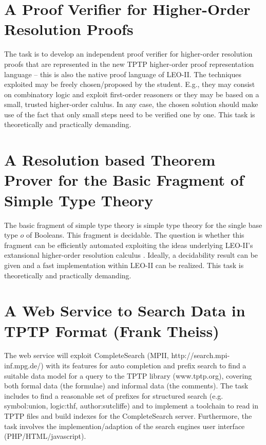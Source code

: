 \documentclass{article}
\begin{document}
\section{A Proof Verifier for Higher-Order Resolution Proofs}
The task is to develop an independent proof verifier for higher-order
resolution proofs that are represented in the new TPTP higher-order
proof representation language -- this is also the native proof
language of LEO-II. The techniques exploited may be freely
chosen/proposed by the student.  E.g., they may consist on combinatory
logic and exploit first-order reasoners or they may be based on a
small, trusted higher-order calulus. In any case, the chosen solution should make
use of the fact that only small steps need to be verified one by one.
This task is theoretically and practically demanding.


\section{A Resolution based Theorem  Prover for the Basic Fragment of  Simple Type Theory}
The basic fragment of simple type theory is simple type theory
\cite{Andrews86} for the single base type $o$ of Booleans. This
fragment is decidable.  The question is whether this fragment can be
efficiently automated exploiting the ideas underlying LEO-II's
extansional higher-order resolution calculus \cite{T2}. Ideally, a
decidability result can be given and a fast implementation within
LEO-II can be realized.  This task is theoretically and practically demanding.


\section{A Web Service to Search Data in TPTP Format (Frank Theiss)}
The web service will exploit CompleteSearch (MPII,
http://search.mpi-inf.mpg.de/) with its features for auto completion
and prefix search to find a suitable data model for a query to the
TPTP library (www.tptp.org), covering both formal data (the formulae)
and informal data (the comments).  The task includes to find a
reasonable set of prefixes for structured search (e.g. symbol:union,
logic:thf, author:sutcliffe) and to implement a toolchain to read in
TPTP files and build indexes for the CompleteSearch
server. Furthermore, the task involves the implemention/adaption of
the search engines user interface (PHP/HTML/javascript).





\end{document}
